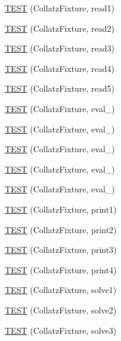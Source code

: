 \begin{DoxyCompactItemize}
\item 
\hyperlink{TestCollatz_8c_09_09_a86061488c66d6ec3993858a2fbc36b0f}{T\-E\-S\-T} (Collatz\-Fixture, read1)
\item 
\hyperlink{TestCollatz_8c_09_09_ab878f3675d378e526be517f391de93fa}{T\-E\-S\-T} (Collatz\-Fixture, read2)
\item 
\hyperlink{TestCollatz_8c_09_09_ae01e053db02b2e24bc79f2e52531cc59}{T\-E\-S\-T} (Collatz\-Fixture, read3)
\item 
\hyperlink{TestCollatz_8c_09_09_aad13b646c8e82511624858050073c2df}{T\-E\-S\-T} (Collatz\-Fixture, read4)
\item 
\hyperlink{TestCollatz_8c_09_09_a1a41dc901afb0a05ccd35f590b7df1ab}{T\-E\-S\-T} (Collatz\-Fixture, read5)
\item 
\hyperlink{TestCollatz_8c_09_09_aa0fcdadaf0d4f7fe0919c37746fe7c74}{T\-E\-S\-T} (Collatz\-Fixture, eval\-\_)
\item 
\hyperlink{TestCollatz_8c_09_09_a333bb6921f06fa177e9818dbcf3eda06}{T\-E\-S\-T} (Collatz\-Fixture, eval\-\_)
\item 
\hyperlink{TestCollatz_8c_09_09_a251001c75c1226c607534268ab3a5bcb}{T\-E\-S\-T} (Collatz\-Fixture, eval\-\_)
\item 
\hyperlink{TestCollatz_8c_09_09_a033aa388470c35adc9579303dba1afa2}{T\-E\-S\-T} (Collatz\-Fixture, eval\-\_)
\item 
\hyperlink{TestCollatz_8c_09_09_ab529bbfe532bd0b6fbc11c51fe0af7e5}{T\-E\-S\-T} (Collatz\-Fixture, eval\-\_)
\item 
\hyperlink{TestCollatz_8c_09_09_a7ff0f20b9076fc1762bec9d580e29238}{T\-E\-S\-T} (Collatz\-Fixture, print1)
\item 
\hyperlink{TestCollatz_8c_09_09_a99f7dd94c98bff5b2e206c364d57e917}{T\-E\-S\-T} (Collatz\-Fixture, print2)
\item 
\hyperlink{TestCollatz_8c_09_09_a9715f206e9057726135c3e1d34f00f87}{T\-E\-S\-T} (Collatz\-Fixture, print3)
\item 
\hyperlink{TestCollatz_8c_09_09_a2affb908eb38d4a104b39fdc1fcc250d}{T\-E\-S\-T} (Collatz\-Fixture, print4)
\item 
\hyperlink{TestCollatz_8c_09_09_a4aa1b21c6a1d60c79e9ced4bd7811171}{T\-E\-S\-T} (Collatz\-Fixture, solve1)
\item 
\hyperlink{TestCollatz_8c_09_09_af3c5c7bbcab1bd27e51f879724f835ee}{T\-E\-S\-T} (Collatz\-Fixture, solve2)
\item 
\hyperlink{TestCollatz_8c_09_09_acfc6b208038cfe4e23cabc1675b318e3}{T\-E\-S\-T} (Collatz\-Fixture, solve3)
\end{DoxyCompactItemize}


